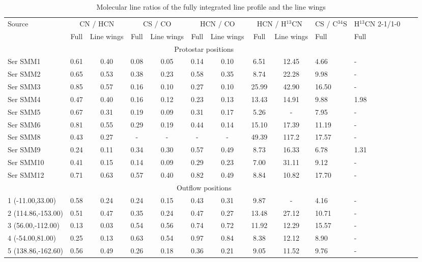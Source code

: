 \documentclass{aa}
\begin{document}
\begin{table*} \caption{Molecular line ratios of the fully integrated line profile and the line wings} %
\small
\label{table:CN/HCN}
\centering 
\begin{tabular}{l c c c c c c c c l l l c } 
\hline\hline 
Source & \multicolumn{2}{c}{CN / HCN} & \multicolumn{2}{c}{CS / CO} & \multicolumn{2}{c}{HCN / CO} & \multicolumn{2}{c}{HCN / H$^{13}$CN} & CS / C$^{34}$S & H$^{13}$CN 2-1/1-0\\
~ & Full & Line wings & Full & Line wings & Full & Line wings & Full & Line wings & Full & Full \\
\hline 
\multicolumn{11}{c}{Protostar positions} \\
\hline 
Ser SMM1 & 0.61 & 0.40 & 0.08 & 0.05 & 0.14 & 0.10 & 6.51 & 12.45 & 4.66 & - \\
Ser SMM2 & 0.65 & 0.53 & 0.38 & 0.23 & 0.58 & 0.35 & 8.74 & 22.28 & 9.98 & - \\
Ser SMM3 & 0.85 & 0.57 & 0.16 & 0.10 & 0.27 & 0.10 & 25.99 & 42.90 & 16.50 & - \\
Ser SMM4 & 0.47 & 0.40 & 0.16 & 0.12 & 0.23 & 0.13 & 13.43 & 14.91 & 9.88 & 1.98 \\
Ser SMM5 & 0.67 & 0.31 & 0.19 & 0.09 & 0.31 & 0.17 & 5.26 & - & 7.95 & - \\
Ser SMM6 & 0.81 & 0.55 & 0.29 & 0.19 & 0.44 & 0.14 & 15.10 & 17.39 & 11.19 & - \\
Ser SMM8 & 0.43 & 0.27 & - & - & - & - & 49.39 & 117.2 & 17.57 & - \\
Ser SMM9 & 0.24 & 0.11 & 0.34 & 0.30 & 0.57 & 0.49 & 8.73 & 16.33 & 6.78 & 1.31 \\
Ser SMM10 & 0.41 & 0.15 & 0.14 & 0.09 & 0.29 & 0.23 & 7.00 & 31.11 & 9.12 & - \\
Ser SMM12 & 0.71 & 0.63 & 0.57 & 0.40 & 0.82 & 0.49 & 8.84 & 10.82 & 17.70 & - \\
\hline 
\multicolumn{11}{c}{Outflow positions} \\
\hline 
1 (-11.00,33.00) & 0.58 & 0.24 & 0.24 & 0.15 & 0.43 & 0.31 & 9.87 & - & 4.16 & - \\
2 (114.86,-153.00) & 0.51 & 0.47 & 0.35 & 0.24 & 0.47 & 0.27 & 13.48 & 27.12 & 10.71 & - \\
3 (56.00,-112.00) & 0.13 & 0.03 & 0.54 & 0.56 & 0.74 & 0.72 & 11.92 & 12.29 & 15.57 & - \\
4 (-54.00,81.00) & 0.25 & 0.13 & 0.63 & 0.54 & 0.97 & 0.84 & 8.38 & 12.12 & 8.90 & - \\
5 (138.86,-162.60) & 0.56 & 0.49 & 0.26 & 0.18 & 0.36 & 0.21 & 9.05 & 11.52 & 9.76 & - \\ 
\hline \end{tabular} 
\end{table*}
\end{document}
